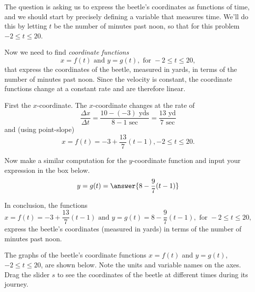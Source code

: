 \documentclass{ximera}
\begin{document}
\begin{explanation}
The question is asking us to express the beetle's coordinates as functions of time, and we should start by precisely defining a variable that measures time. We'll do this by letting $t$ be the number of minutes past noon, so that for this problem $-2 \leq t \leq 20$. 

Now we need to find \emph{coordinate functions}
\[
   x = f(t) \text{ and } y = g(t) , \text{ for } -2\leq t \leq 20 ,
\]
that express the coordinates of the beetle, measured in yards, in terms of the number of minutes past noon.  Since the velocity is constant, the coordinate functions change at a constant rate and are therefore linear.

First the $x$-coordinate. The $x$-coordinate changes at the rate of 
\[
    \frac{\Delta x}{\Delta t} = \frac{10-(-3) \text{ yds}}{8-1 \text{ sec}} = \frac{13 \text{ yd}}{7 \text{ sec}}
\]
and (using point-slope) 
\[
     x = f(t) = -3 + \frac{13}{7}(t-1) , -2\leq t \leq 20 .
\]


\begin{question} 
Now make a similar computation for the $y$-coordinate function and input your expression in the box below. 
\[
 y=g(t) =  \answer{8-\frac{9}{7}(t-1)} 
\]
    \end{question}

In conclusion, the functions
\[
    x = f(t) = -3 + \frac{13}{7}(t-1) \text{ and }  y=g(t) = 8-\frac{9}{7}(t-1) , \text{ for } -2\leq t \leq 20 ,
\]
express the beetle's coordinates (measured in yards) in terms of the number of minutes past noon.

\end{explanation}

\begin{exploration}\label{exp:pc1}
The graphs of the beetle's coordinate functions $x=f(t)$ and $y=g(t)$, $-2\leq t \leq 20$, are shown below. Note the units and variable names on the axes. Drag the slider $s$ to see the coordinates of the beetle at different times during its journey.
 
 
\begin{onlineOnly}
    \begin{center}
\end{center}
\end{onlineOnly}
\end{exploration}
\end{document}
